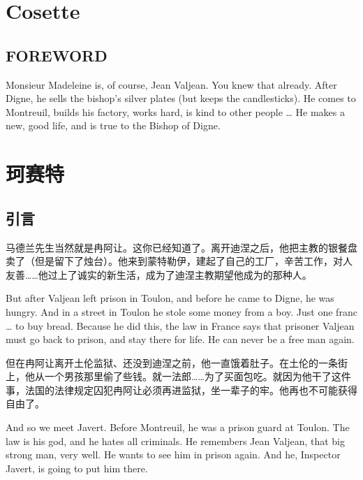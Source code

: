 \documentclass[fontset=ubuntu, zihao=5]{ctexart}
\begin{document}
\clearpage

\begin{paracol}{2}

  \section{Cosette}

  \subsection*{FOREWORD}


  Monsieur Madeleine is, of course, Jean Valjean. You knew that already. After Digne, he sells the bishop's silver plates (but keeps the candlesticks). He comes to Montreuil, builds his factory, works hard, is kind to other people \ldots{} He makes a new, good life, and is true to the Bishop of Digne.

  \switchcolumn

  \section*{珂赛特}

  \subsection*{引言}

  马德兰先生当然就是冉阿让。这你已经知道了。离开迪涅之后，他把主教的银餐盘卖了（但是留下了烛台）。他来到蒙特勒伊，建起了自己的工厂，辛苦工作，对人友善……他过上了诚实的新生活，成为了迪涅主教期望他成为的那种人。

  \switchcolumn*

  But after Valjean left prison in Toulon, and before he came to Digne, he was hungry. And in a street in Toulon he stole some money from a boy. Just one franc \ldots{} to buy bread. Because he did this, the law in France says that prisoner Valjean must go back to prison, and stay there for life. He can never be a free man again.

  \switchcolumn

  但在冉阿让离开土伦监狱、还没到迪涅之前，他一直饿着肚子。在土伦的一条街上，他从一个男孩那里偷了些钱。就一法郎……为了买面包吃。就因为他干了这件事，法国的法律规定囚犯冉阿让必须再进监狱，坐一辈子的牢。他再也不可能获得自由了。

  \switchcolumn*

  And so we meet Javert. Before Montreuil, he was a prison guard at Toulon. The law is his god, and he hates all criminals. He remembers Jean Valjean, that big strong man, very well. He wants to see him in prison again. And he, Inspector Javert, is going to put him there.


\end{paracol}
\end{document}

